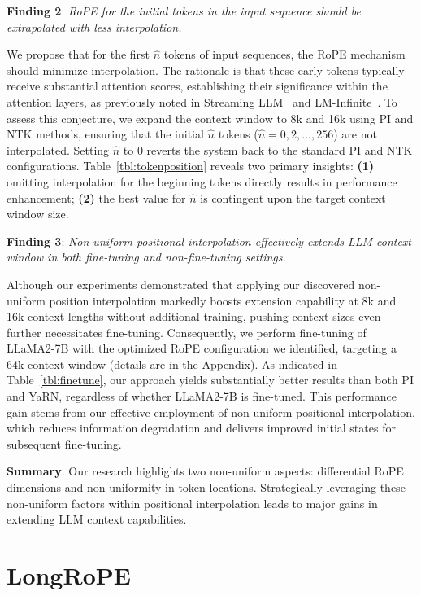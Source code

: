\textbf{Finding 2}: \textit{RoPE for the initial tokens in the input sequence should be extrapolated with less interpolation.} 

We propose that for the first $\hat{n}$ tokens of input sequences, the RoPE mechanism should minimize interpolation. The rationale is that these early tokens typically receive substantial attention scores, establishing their significance within the attention layers, as previously noted in Streaming LLM~\cite{streamingllm} and LM-Infinite~\cite{han2023lminfinite}. To assess this conjecture, we expand the context window to 8k and 16k using PI and NTK methods, ensuring that the initial $\hat n$ tokens ($\hat n=0,2, ..., 256$) are not interpolated. Setting $\hat n$ to 0 reverts the system back to the standard PI and NTK configurations. Table~\ref{tbl:tokenposition} reveals two primary insights: \textbf{(1)} omitting interpolation for the beginning tokens directly results in performance enhancement; \textbf{(2)} the best value for $\hat n$ is contingent upon the target context window size.

\textbf{Finding 3}: \textit{Non-uniform positional interpolation effectively extends LLM context window in both fine-tuning and non-fine-tuning settings.} 

Although our experiments demonstrated that applying our discovered non-uniform position interpolation markedly boosts extension capability at 8k and 16k context lengths without additional training, pushing context sizes even further necessitates fine-tuning. Consequently, we perform fine-tuning of LLaMA2-7B with the optimized RoPE configuration we identified, targeting a 64k context window (details are in the Appendix). As indicated in Table~\ref{tbl:finetune}, our approach yields substantially better results than both PI and YaRN, regardless of whether LLaMA2-7B is fine-tuned. This performance gain stems from our effective employment of non-uniform positional interpolation, which reduces information degradation and delivers improved initial states for subsequent fine-tuning.

\textbf{Summary}. Our research highlights two non-uniform aspects: differential RoPE dimensions and non-uniformity in token locations. Strategically leveraging these non-uniform factors within positional interpolation leads to major gains in extending LLM context capabilities.

\section{LongRoPE}

